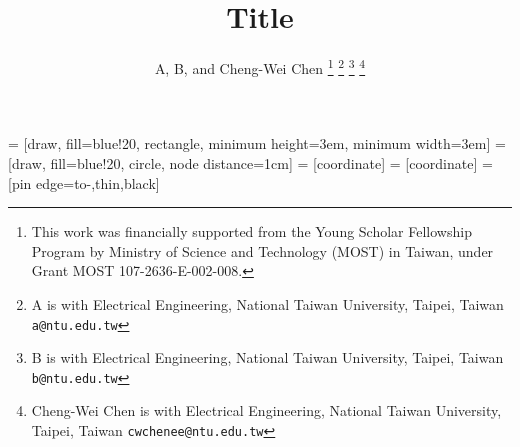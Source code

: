 \documentclass[letterpaper, 10 pt, conference]{ieeetran}
\title{\LARGE \bf
Title
}
\author{A, B, and Cheng-Wei Chen %
\thanks{This work was financially supported from the Young Scholar Fellowship Program by Ministry of Science and Technology (MOST) in Taiwan, under Grant MOST 107-2636-E-002-008.}
\thanks{A is with Electrical Engineering, National Taiwan University, Taipei, Taiwan
        {\tt\small a@ntu.edu.tw}}%
\thanks{B is with Electrical Engineering, National Taiwan University, Taipei, Taiwan
        {\tt\small b@ntu.edu.tw}}%
\thanks{Cheng-Wei Chen is with Electrical Engineering, National Taiwan University, Taipei, Taiwan
        {\tt\small cwchenee@ntu.edu.tw}}%
}
\begin{document}

 = [draw, fill=blue!20, rectangle, 
    minimum height=3em, minimum width=3em]
 = [draw, fill=blue!20, circle, node distance=1cm]
 = [coordinate]
 = [coordinate]
 = [pin edge={to-,thin,black}]

\maketitle
\thispagestyle{empty}
\pagestyle{empty}
\maketitle





\end{document}
